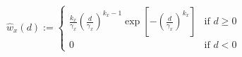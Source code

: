 \begin{equation}
\hat{w}_x(d) :=
	\begin{cases}
		\frac{k_x}{\gamma_x}\left(\frac{d}{\gamma_x}\right)^{k_x-1}\exp\left[-\left(\frac{d}{\gamma_x}\right)^{k_x}\right] &\text{if } d \geq 0 \\
		0 &\text{if } d < 0
	\end{cases}
\end{equation}
